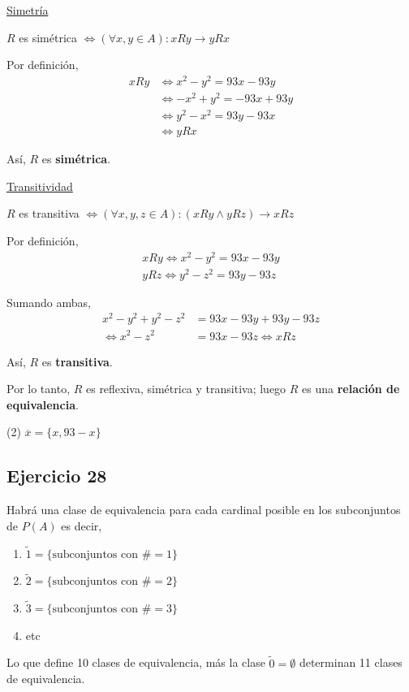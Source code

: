 \underline{Simetría}

$R$ es simétrica $\iff (\forall x, y \in A): xRy \rightarrow yRx$

Por definición, 
\begin{align*}
    xRy &\iff x^2 - y^2 = 93x - 93y \\
    &\iff -x^2 + y^2 = -93x +93y \\
    &\iff y^2 -x^2 = 93y -93x \\
    &\iff yRx
\end{align*}

Así, $R$ es \textbf{simétrica}.

\underline{Transitividad}

$R$ es transitiva $\iff (\forall x, y, z \in A): (xRy \wedge yRz) \rightarrow xRz$

Por definición,
\begin{align*}
    xRy \iff x^2 - y^2 = 93x - 93y \\
    yRz \iff y^2 - z^2 = 93y - 93z
\end{align*}

Sumando ambas,
\begin{align*}
    x^2 - y^2 + y^2 - z^2 &= 93x - 93y +93y - 93z \\
    \iff x^2 -z^2 &= 93x - 93z \iff xRz 
\end{align*}

Así, $R$ es \textbf{transitiva}.

Por lo tanto, $R$ es reflexiva, simétrica y transitiva; luego $R$ es una \textbf{relación de equivalencia}.

(2) $\overline{x} = \{ x, 93-x \}$

\subsection{Ejercicio 28}
Habrá una clase de equivalencia para cada cardinal posible en los subconjuntos de $P(A)$ es decir,
\begin{enumerate}[label=(\alph*)]
    \item $\tilde{1} = \{ \text{subconjuntos con }\#=1 \}$
    \item $\tilde{2} = \{ \text{subconjuntos con }\#=2 \}$
    \item $\tilde{3} = \{ \text{subconjuntos con }\#=3 \}$
    \item etc
\end{enumerate}

Lo que define 10 clases de equivalencia, más la clase $\tilde{0} = \emptyset$ determinan 11 clases de equivalencia.


